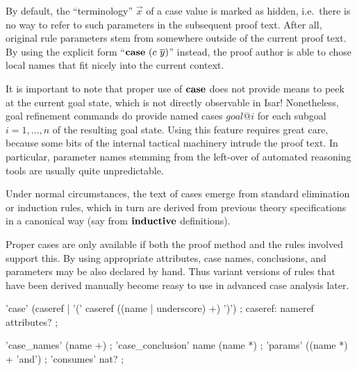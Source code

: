 By default, the ``terminology'' $\vec x$ of a case value is marked as hidden,
i.e.\ there is no way to refer to such parameters in the subsequent proof
text.  After all, original rule parameters stem from somewhere outside of the
current proof text.  By using the explicit form ``${\mathord{\mathbf{case}}}~(c~\overline{y})$''
instead, the proof author is able to chose local names that fit nicely into
the current context.

\medskip

It is important to note that proper use of ${\mathord{\mathbf{case}}}$ does not provide means
to peek at the current goal state, which is not directly observable in Isar!
Nonetheless, goal refinement commands do provide named cases $goal@i$ for each
subgoal $i = 1, \dots, n$ of the resulting goal state.  Using this feature
requires great care, because some bits of the internal tactical machinery
intrude the proof text.  In particular, parameter names stemming from the
left-over of automated reasoning tools are usually quite unpredictable.

Under normal circumstances, the text of cases emerge from standard elimination
or induction rules, which in turn are derived from previous theory
specifications in a canonical way (say from ${\mathord{\mathbf{inductive}}}$
definitions).

\medskip Proper cases are only available if both the proof method and the
rules involved support this.  By using appropriate attributes, case names,
conclusions, and parameters may be also declared by hand.  Thus variant
versions of rules that have been derived manually become reasy to use in
advanced case analysis later.

\begin{rail}
  'case' (caseref | '(' caseref ((name | underscore) +) ')')
  ;
  caseref: nameref attributes?
  ;

  'case\_names' (name +)
  ;
  'case\_conclusion' name (name *)
  ;
  'params' ((name *) + 'and')
  ;
  'consumes' nat?
  ;
\end{rail}

